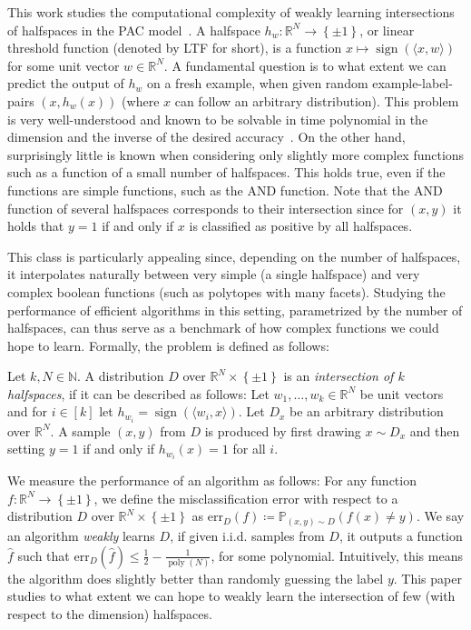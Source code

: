 \documentclass{theoretics}
\newcommand{\Set}[1]{\left\{#1\right\}}
\newcommand{\iprod}[1]{\langle#1\rangle}
\newcommand{\Psymb}{\mathbb{P}}
\DeclareMathOperator{\poly}{poly}
\DeclareMathOperator{\sign}{sign}
\newcommand{\iid}{i.i.d.\xspace}
\newcommand{\N}{\mathbb N}
\newcommand{\R}{\mathbb R}
\renewcommand{\leq}{\leqslant}
\newcommand{\err}{\mathrm{err}}
\begin{document}
This work studies the computational complexity of weakly learning intersections of halfspaces in the PAC model~\cite{DBLP:journals/cacm/Valiant84}.
A halfspace $h_w \colon \R^N \rightarrow \Set{\pm1}$, or linear threshold function (denoted by LTF for short), is a function $x \mapsto \sign(\iprod{x,w})$ for some unit vector $w \in \R^N$.
A fundamental question is to what extent we can predict the output of $h_w$ on a fresh example, when given random example-label-pairs $(x,h_w(x))$ (where $x$ can follow an arbitrary distribution).
This problem is very well-understood and known to be solvable in time polynomial in the dimension and the inverse of the desired accuracy~\cite{maass1994fast}.
On the other hand, surprisingly little is known when considering only slightly more complex functions such as a function of a small number of halfspaces.
This holds true, even if the functions are simple functions, such as the $\mathrm{AND}$ function.
Note that the $\mathrm{AND}$ function of several halfspaces corresponds to their intersection since for $(x,y)$ it holds that $y = 1$ if and only if $x$ is classified as positive by all halfspaces.

This class is particularly appealing since, depending on the number of halfspaces, it interpolates naturally between very simple (a single halfspace) and very complex boolean functions (such as polytopes with many facets).
Studying the performance of efficient algorithms in this setting, parametrized by the number of halfspaces, can thus serve as a benchmark of how complex functions we could hope to learn.
Formally, the problem is defined as follows:
\begin{definition}
    Let $k,N \in \N$.
    A distribution $D$ over $\R^N \times \Set{\pm 1}$ is an \emph{intersection of $k$ halfspaces}, if it can be described as follows:
    Let $w_1,\ldots, w_k \in \R^N$ be unit vectors and for $i \in [k]$ let $h_{w_i} = \sign(\iprod{w_i,x})$.
    Let $D_x$ be an arbitrary distribution over $\R^N$.
    A sample $(x,y)$ from $D$ is produced by first drawing $x \sim D_x$ and then setting $y = 1$ if and only if $h_{w_i}(x) = 1$ for all $i$.
\end{definition}

We measure the performance of an algorithm as follows:
For any function $f \colon \R^N \rightarrow \Set{\pm 1}$, we define the misclassification error with respect to a distribution $D$ over $\R^N \times \Set{\pm 1}$ as $\err_D(f) \coloneqq \Psymb_{(x,y) \sim D} (f(x) \neq y)$.
We say an algorithm \emph{weakly} learns $D$, if given \iid samples from $D$, it outputs a function $\hat{f}$ such that $\err_D(\hat{f}) \leq \tfrac 1 2 - \tfrac 1 {\poly(N)}$, for some polynomial.
Intuitively, this means the algorithm does slightly better than randomly guessing the label $y$.
This paper studies to what extent we can hope to weakly learn the intersection of few (with respect to the dimension) halfspaces.
\end{document}
